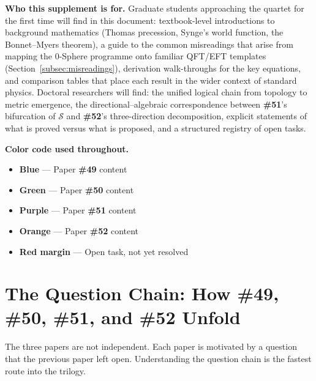 \documentclass[12pt,letterpaper]{article}
\newcommand{\paperno}[1]{\textbf{\#{}#1}}
\newcommand{\calS}{\mathcal{S}}
\begin{document}
\noindent\textbf{Who this supplement is for.}
Graduate students approaching the quartet for the first time will find in this document:
textbook-level introductions to background mathematics (Thomas precession,
Synge's world function, the Bonnet--Myers theorem),
a guide to the common misreadings that arise from mapping the 0-Sphere programme
onto familiar QFT/EFT templates (Section~\ref{subsec:misreadings}),
derivation walk-throughs for the key equations,
and comparison tables that place each result in the wider context of standard physics.
Doctoral researchers will find: the unified logical chain from topology to metric emergence,
the directional--algebraic correspondence between \paperno{51}'s bifurcation of $\calS$
and \paperno{52}'s three-direction decomposition,
explicit statements of what is proved versus what is proposed,
and a structured registry of open tasks.

\noindent\textbf{Color code used throughout.}
\begin{itemize}[leftmargin=2em, itemsep=2pt]
  \item \textcolor{threadblue}{\textbf{Blue}} --- Paper \paperno{49} content
  \item \textcolor{threadgreen}{\textbf{Green}} --- Paper \paperno{50} content
  \item \textcolor{threadpurple}{\textbf{Purple}} --- Paper \paperno{51} content
  \item \textcolor{orange!80!black}{\textbf{Orange}} --- Paper \paperno{52} content
  \item \textcolor{threadred}{\textbf{Red margin}} --- Open task, not yet resolved
\end{itemize}

\clearpage

\section{\texorpdfstring{The Question Chain: How \#49, \#50, \#51, and \#52 Unfold}{The Question Chain: How \#49, \#50, \#51, and \#52 Unfold}}
\label{sec:chain}

The three papers are not independent. Each paper is motivated by a question that the
previous paper left open. Understanding the question chain is the fastest route into
the trilogy.
\end{document}
